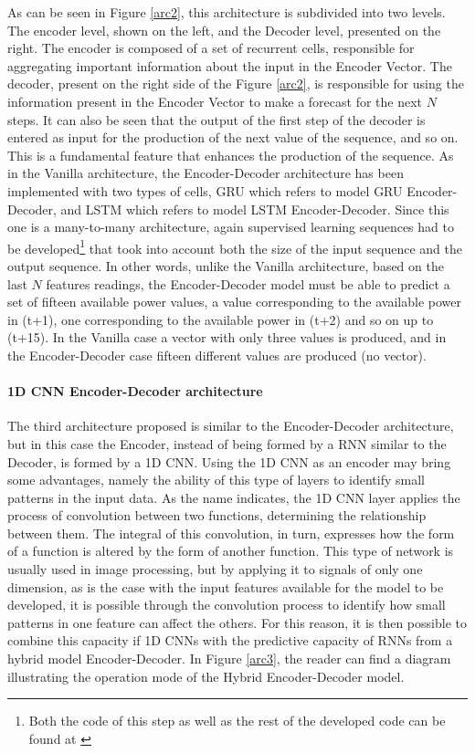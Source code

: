 As can be seen in Figure \ref{arc2}, this architecture is subdivided into two levels. The encoder level, shown on the left, and the Decoder level, presented on the right. The encoder is composed of a set of recurrent cells, responsible for aggregating important information about the input in the Encoder Vector. The decoder, present on the right side of the Figure \ref{arc2}, is responsible for using the information present in the Encoder Vector to make a forecast for the next $N$ steps. It can also be seen that the output of the first step of the decoder is entered as input for the production of the next value of the sequence, and so on. This is a fundamental feature that enhances the production of the sequence. As in the Vanilla architecture, the Encoder-Decoder architecture has been implemented with two types of cells, \ac{GRU} which refers to model \ac{GRU} Encoder-Decoder, and \ac{LSTM} which refers to model \ac{LSTM} Encoder-Decoder. Since this one is a many-to-many architecture, again supervised learning sequences had to be developed\footnote{Both the code of this step as well as the rest of the developed code can be found at \cite{code}} that took into account both the size of the input sequence and the output sequence. In other words, unlike the Vanilla architecture, based on the last $N$ features readings, the Encoder-Decoder model must be able to predict a set of fifteen available power values, a value corresponding to the available power in (t+1), one corresponding to the available power in (t+2) and so on up to (t+15). In the Vanilla case a vector with only three values is produced, and in the Encoder-Decoder case fifteen different values are produced (no vector).




\paragraph*{1D CNN Encoder-Decoder architecture}


The third architecture proposed is similar to the Encoder-Decoder architecture, but in this case the Encoder, instead of being formed by a \ac{RNN} similar to the Decoder, is formed by a \ac{1D CNN}. Using the \ac{1D CNN} as an encoder may bring some advantages, namely the ability of this type of layers to identify small patterns in the input data. As the name indicates, the \ac{1D CNN} layer applies the process of convolution between two functions, determining the relationship between them. The integral of this convolution, in turn, expresses how the form of a function is altered by the form of another function. This type of network is usually used in image processing, but by applying it to signals of only one dimension, as is the case with the input features available for the model to be developed, it is possible through the convolution process to identify how small patterns in one feature can affect the others. For this reason, it is then possible to combine this capacity if \ac{1D CNN}s with the predictive capacity of \ac{RNN}s from a hybrid model Encoder-Decoder. In Figure \ref{arc3}, the reader can find a diagram illustrating the operation mode of the Hybrid Encoder-Decoder model.

